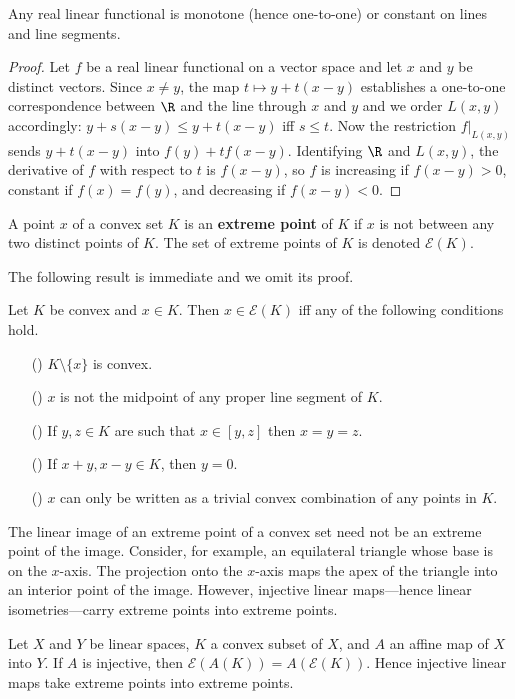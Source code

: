 \begin{proposition}
Any real linear functional is monotone (hence one-to-one) or constant on lines and line segments.
\end{proposition}
\begin{proof}
Let $f$ be a real linear functional on a vector space and let $x$ and $y$ be distinct vectors. Since $x\neq y$, the map $t\mapsto y+t(x-y)$ establishes a one-to-one correspondence between $\R$ and the line through $x$ and $y$ and we order $L(x,y)$ accordingly: $y+s(x-y)\leq y+t(x-y)$ iff $s\leq t$. Now the restriction $f|_{L(x,y)}$ sends $y+t(x-y)$ into $f(y)+tf (x -y)$. Identifying $\R$ and $L(x,y)$, the derivative of $f$ with respect to $t$ is $f(x-y)$, so $f$ is increasing if $f(x-y)>0$, constant if $f(x)=f(y)$, and decreasing if $f(x-y)<0$.
\end{proof}
\begin{definition}
A point $x$ of a convex set $K$ is an \textbf{extreme point} of $K$ if $x$ is not between any two distinct points of $K$. The set of extreme points of $K$ is denoted $\mathcal{E}(K)$.
\end{definition}
The following result is immediate and we omit its proof.
\begin{proposition}
Let $K$ be convex and $x\in K$. Then $x\in\mathcal{E}(K)$ iff any of the following conditions hold.
\begin{itemize}
\item[(\rmnum{1})] $K\setminus\{x\}$ is convex.
\item[(\rmnum{2})] $x$ is not the midpoint of any proper line segment of $K$.
\item[(\rmnum{3})] If $y,z\in K$ are such that $x\in[y,z]$ then $x=y=z$.
\item[(\rmnum{4})] If $x+y,x-y\in K$, then $y=0$.
\item[(\rmnum{5})] $x$ can only be written as a trivial convex combination of any points in $K$. 
\end{itemize}
\end{proposition}
The linear image of an extreme point of a convex set need not be an extreme point of the image. Consider, for example, an equilateral triangle whose base is on the $x$-axis. The projection onto the $x$-axis maps the apex of the triangle into an interior point of the image. However, injective linear maps---hence linear isometries---carry extreme points into extreme points.
\begin{proposition}\label{extreme point affine injective map}
Let $X$ and $Y$ be linear spaces, $K$ a convex subset of $X$, and $A$ an affine map of $X$ into $Y$. If $A$ is injective, then $\mathcal{E}(A(K))=A(\mathcal{E}(K))$. Hence injective linear maps take extreme points into extreme points.
\end{proposition}

